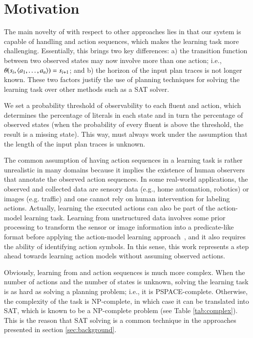 
\section{Motivation}
\label{sec:motivation}

The main novelty of \FAMA with respect to other approaches lies in that our system is capable of handling \PO and \NO action sequences, which makes the learning task more challenging. Essentially, this brings two key differences: a) the transition function between two observed states may now involve more than one action; i.e., $\theta(s_i,{\langle a_1,\ldots,a_n \rangle})=s_{i+1}$; and b) the horizon of the input plan traces is not longer known. These two factors justify the use of planning techniques for solving the learning task over other methods such as a SAT solver.

We set a probability threshold of observability to each fluent and action, which determines the percentage of literals in each state and in turn the percentage of observed states (when the probability of every fluent is above the threshold, the result is a missing state). This way, \FAMA must always work under the assumption that the length of the input plan traces is unknown.

The common assumption of having \FO action sequences in a learning task is rather unrealistic in many domains because it implies the existence of human observers that annotate the observed action sequences. In some real-world applications, the observed and collected data are sensory data (e.g., home automation, robotics) or images (e.g. traffic) and one cannot rely on human intervention for labeling actions. Actually, learning the executed actions can also be part of the action-model learning task. Learning from unstructured data involves some prior processing to transform the sensor or image information into a predicate-like format before applying the action-model learning approach~\cite{AsaiF18}, and it also requires the ability of identifying action symbols. In this sense, this work represents a step ahead towards learning action models without assuming observed actions.

Obviously, learning from \PO and \NO action sequences is much more complex. When the number of actions and the number of states is unknown, solving the learning task is as hard as solving a \strips\texttt{} planning problem; i.e., it is PSPACE-complete. Otherwise, the complexity of the task is NP-complete, in which case it can be translated into SAT, which is known to be a NP-complete problem (see Table \ref{tab:complex}). This is the reason that SAT solving is a common technique in the approaches presented in section \ref{sec:background}.


